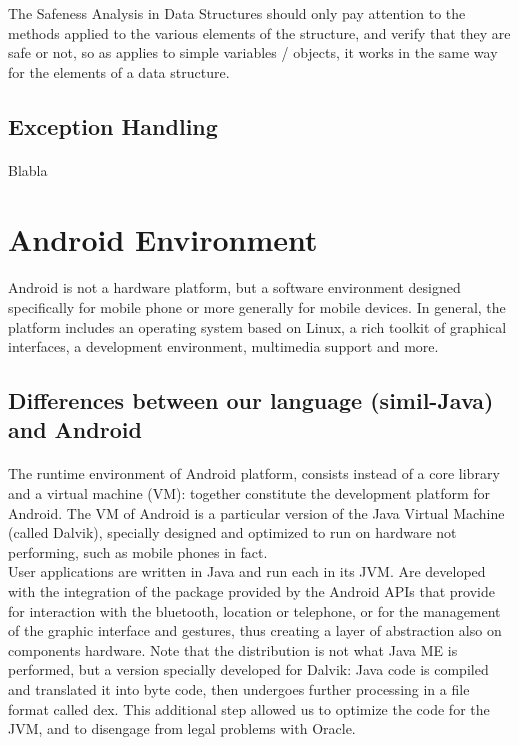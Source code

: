 \documentclass[letterpaper,twocolumn,10pt]{article}
\begin{document}
The Safeness Analysis in Data Structures should only pay attention to the methods applied to the various elements of the structure, and verify that they are safe or not, so as applies to simple variables / objects, it works in the same way for the elements of a data structure.


\subsection{Exception Handling}
\paragraph{}
Blabla


\section{Android Environment}
\paragraph{}
Android is not a hardware platform, but a software environment designed specifically for mobile phone or more generally for mobile devices. In general, the platform includes an operating system based on Linux, a rich toolkit of graphical interfaces, a development environment, multimedia support and more.

\subsection{Differences between our language (simil-Java) and Android}
\paragraph{}
The runtime environment of Android platform, consists instead of a core library and a virtual machine (VM): together constitute the development platform for Android. The VM of Android is a particular version of the Java Virtual Machine (called Dalvik), specially designed and optimized to run on hardware not performing, such as mobile phones in fact.\\

User applications are written in Java and run each in its JVM. Are developed with the integration of the package provided by the Android APIs that provide for interaction with the bluetooth, location or telephone, or for the management of the graphic interface and gestures, thus creating a layer of abstraction also on components hardware. Note that the distribution is not what Java ME is performed, but a version specially developed for Dalvik: Java code is compiled and translated it into byte code, then undergoes further processing in a file format called dex. This additional step allowed us to optimize the code for the JVM, and to disengage from legal problems with Oracle.
\end{document}
